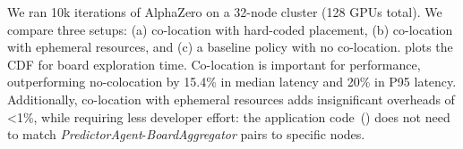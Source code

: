 We ran 10k iterations of AlphaZero on a 32-node cluster (128 GPUs total). %
We compare three setups: 
(a) co-location with hard-coded placement,
(b) co-location with ephemeral resources, and 
(c) a baseline policy with no co-location. 
 plots the CDF for board exploration time. %
Co-location is important for performance, outperforming no-colocation by 15.4\% in median latency and 20\% in P95 latency. %
Additionally, co-location with ephemeral resources adds insignificant overheads of <1\%, while requiring less developer effort: the application code~() does not need to match \textit{PredictorAgent}-\textit{BoardAggregator} pairs to specific nodes.







